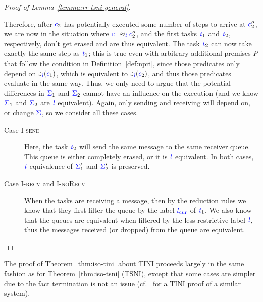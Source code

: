 \documentclass{sigplanconf}
\newcommand{\Varid}[1]{\mathit{#1}}
\newcommand{\Red}[1]{{\color{red} #1}}
\newcommand{\tocite}[1]{\Red{\cite{#1}}}
\begin{document}
\begin{proof}[Proof of Lemma~\ref{lemma:rr-tsni-general}]
\begin{itemize}
    Therefore, after \ensuremath{\ifc{c}_{2}} has potentially executed some number of steps
    to arrive at \ensuremath{\ifc{c}_{2}''}, we are now in the situation where $\ensuremath{\ifc{c}_{1}}\approx_{\ensuremath{\ifc{\Varid{l}}}}\ensuremath{\ifc{c}_{2}''}$, and the first tasks \ensuremath{\ifc{\Varid{t}}_{1}} and \ensuremath{\ifc{\Varid{t}}_{2}},
    respectively, don't get erased and are thus equivalent.
    The task \ensuremath{\ifc{\Varid{t}}_{2}} can now take exactly the same step as \ensuremath{\ifc{\Varid{t}}_{1}};  this
    is true even with arbitrary additional premises $P$ that follow
    the condition in Definition~\ref{def:npri}, since those
    predicates only depend on \ensuremath{\varepsilon_{\ifc{\Varid{l}}}(\ifc{c}_{1})}, which is equivalent
    to \ensuremath{\varepsilon_{\ifc{\Varid{l}}}(\ifc{c}_{2})}, and thus those predicates evaluate in the same way.
    Thus, we only
    need to argue that the potential differences in \ensuremath{\ifc{\Sigma}_{1}} and \ensuremath{\ifc{\Sigma}_{2}} cannot
    have an influence on the execution (and we know \ensuremath{\ifc{\Sigma}_{1}} and \ensuremath{\ifc{\Sigma}_{2}} are
    \ensuremath{\ifc{\Varid{l}}} equivalent).
    Again, only sending and receiving will depend on, or change \ensuremath{\ifc{\Sigma}},
    so we consider all these cases.
    \begin{description}
      \item[Case \textsc{I-send}]
      Here, the task \ensuremath{\ifc{\Varid{t}}_{2}} will send the same message to the same
      receiver queue. This
      queue is either completely erased, or it is \ensuremath{\ifc{\Varid{l}}} equivalent.  In both
      cases, \ensuremath{\ifc{\Varid{l}}} equivalence of \ensuremath{\ifc{\Sigma}_{1}'} and \ensuremath{\ifc{\Sigma}_{2}'} is preserved.
      \item[Case \textsc{I-recv} and \textsc{I-noRecv}]
      When the tasks are receiving a message, then by the reduction rules
      we know that they first filter the queue by the label
      \ensuremath{\lcurr} of \ensuremath{\ifc{\Varid{t}}_{1}}.  We
      also know that the queues are equivalent when filtered by the less
      restrictive label \ensuremath{\ifc{\Varid{l}}}, thus the messages received (or dropped) from the
      queue are equivalent.
    \end{description}
  \end{itemize}
\end{proof}


The proof of Theorem~\ref{thm:iso-tini} about TINI proceeds largely
in the same fashion as for Theorem~\ref{thm:iso-tsni} (TSNI), except that
some cases are simpler due to the fact termination is not an issue
(cf.~\tocite{} for a TINI proof of a similar system).
\end{document}
